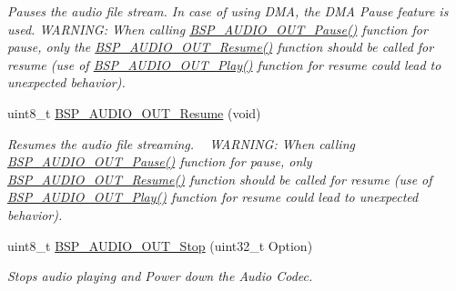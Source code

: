\begin{DoxyCompactItemize}
\begin{DoxyCompactList}\small\item\em Pauses the audio file stream. In case of using D\+MA, the D\+MA Pause feature is used. W\+A\+R\+N\+I\+NG\+: When calling \mbox{\hyperlink{group___s_t_m32_f4___d_i_s_c_o_v_e_r_y___a_u_d_i_o___o_u_t___private___functions_ga73a0f92b8adbfb2e8207067434c2bfef}{B\+S\+P\+\_\+\+A\+U\+D\+I\+O\+\_\+\+O\+U\+T\+\_\+\+Pause()}} function for pause, only the \mbox{\hyperlink{group___s_t_m32_f4___d_i_s_c_o_v_e_r_y___a_u_d_i_o___o_u_t___private___functions_ga064f0eddd4ab25a33fd1fe83af429c9f}{B\+S\+P\+\_\+\+A\+U\+D\+I\+O\+\_\+\+O\+U\+T\+\_\+\+Resume()}} function should be called for resume (use of \mbox{\hyperlink{group___s_t_m32_f4___d_i_s_c_o_v_e_r_y___a_u_d_i_o___o_u_t___private___functions_gaa415fdd481a01468fdfcd9d91f0f6711}{B\+S\+P\+\_\+\+A\+U\+D\+I\+O\+\_\+\+O\+U\+T\+\_\+\+Play()}} function for resume could lead to unexpected behavior). \end{DoxyCompactList}\item 
uint8\+\_\+t \mbox{\hyperlink{group___s_t_m32_f4___d_i_s_c_o_v_e_r_y___a_u_d_i_o___o_u_t___private___functions_ga064f0eddd4ab25a33fd1fe83af429c9f}{B\+S\+P\+\_\+\+A\+U\+D\+I\+O\+\_\+\+O\+U\+T\+\_\+\+Resume}} (void)
\begin{DoxyCompactList}\small\item\em Resumes the audio file streaming. ~\newline
W\+A\+R\+N\+I\+NG\+: When calling \mbox{\hyperlink{group___s_t_m32_f4___d_i_s_c_o_v_e_r_y___a_u_d_i_o___o_u_t___private___functions_ga73a0f92b8adbfb2e8207067434c2bfef}{B\+S\+P\+\_\+\+A\+U\+D\+I\+O\+\_\+\+O\+U\+T\+\_\+\+Pause()}} function for pause, only \mbox{\hyperlink{group___s_t_m32_f4___d_i_s_c_o_v_e_r_y___a_u_d_i_o___o_u_t___private___functions_ga064f0eddd4ab25a33fd1fe83af429c9f}{B\+S\+P\+\_\+\+A\+U\+D\+I\+O\+\_\+\+O\+U\+T\+\_\+\+Resume()}} function should be called for resume (use of \mbox{\hyperlink{group___s_t_m32_f4___d_i_s_c_o_v_e_r_y___a_u_d_i_o___o_u_t___private___functions_gaa415fdd481a01468fdfcd9d91f0f6711}{B\+S\+P\+\_\+\+A\+U\+D\+I\+O\+\_\+\+O\+U\+T\+\_\+\+Play()}} function for resume could lead to unexpected behavior). \end{DoxyCompactList}\item 
uint8\+\_\+t \mbox{\hyperlink{group___s_t_m32_f4___d_i_s_c_o_v_e_r_y___a_u_d_i_o___o_u_t___private___functions_gad1a2df4f21ae348be27cecff63dfca1c}{B\+S\+P\+\_\+\+A\+U\+D\+I\+O\+\_\+\+O\+U\+T\+\_\+\+Stop}} (uint32\+\_\+t Option)
\begin{DoxyCompactList}\small\item\em Stops audio playing and Power down the Audio Codec. \end{DoxyCompactList}\item 

\end{DoxyCompactItemize}
